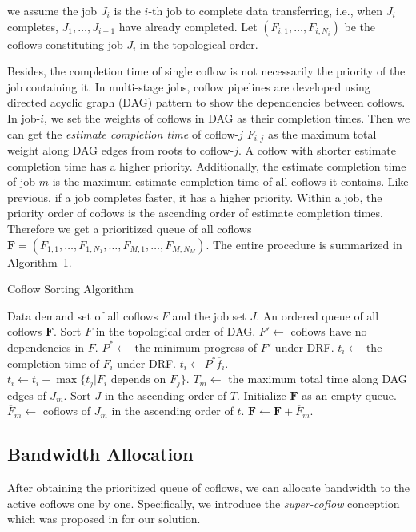 \documentclass[10pt, conference, letterpaper]{IEEEtran}
\begin{document}
we assume the job $J_i$ is the $i$-th job to complete data transferring, i.e., when $J_i$ completes, $J_1,\dots,J_{i-1}$ have already completed. Let $(F_{i,1},\dots,F_{i,N_i})$ be the coflows constituting job $J_i$ in the topological order.

Besides, the completion time of single coflow is not necessarily the priority of the job containing it. In multi-stage jobs, coflow pipelines are developed using directed acyclic graph (DAG) pattern to show the dependencies between coflows. In job-$i$, we set the weights of coflows in DAG as their completion times. Then we can get the \emph{estimate completion time} of coflow-$j$ $F_{i,j}$ as the maximum total weight along DAG edges from roots to coflow-$j$. A coflow with shorter estimate completion time has a higher priority. Additionally, the estimate completion time of job-$m$ is the maximum estimate completion time of all coflows it contains. Like previous, if a job completes faster, it has a higher priority. Within a job, the priority order of coflows is the ascending order of estimate completion times. Therefore we get a prioritized queue of all coflows $\mathbf{F} = (F_{1,1},\dots,F_{1,N_1},\dots,F_{M,1},\dots,F_{M,N_M})$. The entire procedure is summarized in Algorithm~1.

\begin{algorithm}
	\caption{Coflow Sorting Algorithm}
	\begin{algorithmic}[1]
		\Require Data demand set of all coflows $F$ and the job set $J$.
		\Ensure An ordered queue of all coflows $\mathbf{F}$. 
		\State Sort $F$ in the topological order of DAG.
		\State $F' \gets $ coflows have no dependencies in $F$.
		\State $P^* \gets$ the minimum progress of $F'$ under DRF.
				\State $t_i \gets$ the completion time of $F_i$ under DRF.
			\Else
				\State $t_i \gets P^*\overline{f}_i$.
			\EndIf
				\State $t_i \gets t_i + \max{\{t_j|F_i \text{ depends on } F_j\}}$.
			\EndIf
		\EndFor
		\State $T_m \gets$ the maximum total time along DAG edges of $J_m$.
		\State Sort $J$ in the ascending order of $T$.
		\State Initialize $\mathbf{F}$ as an empty queue.
			\State $\overline{F}_m \gets$ coflows of $J_m$ in the ascending order of $t$.
			\State $\mathbf{F} \gets \mathbf{F} + \overline{F}_m$.
		\EndFor
	\end{algorithmic}
\end{algorithm}

\subsection{Bandwidth Allocation}
After obtaining the prioritized queue of coflows, we can allocate bandwidth to the active coflows one by one. Specifically, we introduce the \emph{super-coflow} conception which was proposed in \cite{utopia} for our solution.
\end{document}
